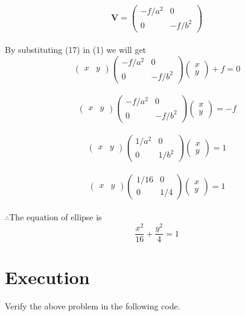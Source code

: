 \documentclass[10pt, a4paper]{article}
\newcommand{\myvec}[1]{\ensuremath{\begin{pmatrix}#1\end{pmatrix}}}
\let\vec\mathbf
\begin{document}
\begin{equation}
\vec{V}=\myvec{-f/a^2&0\\0&-f/b^2}
\end{equation}\\
By substituting (17) in (1) we will get\\
\begin{equation}
\myvec{x&y}\myvec{-f/a^2&0\\0&-f/b^2}\myvec{x\\y}+f=0
\end{equation}\\
\begin{equation}
\myvec{x&y}\myvec{-f/a^2&0\\0&-f/b^2}\myvec{x\\y}=-f
\end{equation}\\
\begin{equation}
\myvec{x&y}\myvec{1/a^2&0\\0&1/b^2}\myvec{x\\y}=1
\end{equation}\\
\begin{equation}
\myvec{x&y}\myvec{1/16&0\\0&1/4}\myvec{x\\y}=1
\end{equation}\\
$\therefore$The equation of ellipse is\\
\begin{equation}
\frac{x^2}{16}+\frac{y^2}{4}=1
\end{equation}
\section{Execution}
Verify the above problem in the following code.\\

\end{document}
